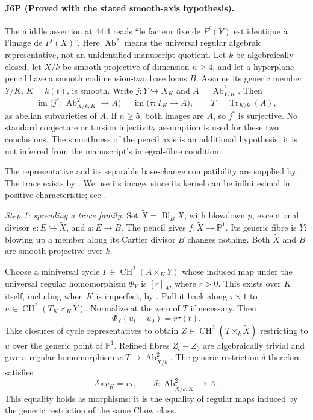 \paragraph{J6P (Proved with the stated smooth-axis hypothesis).}
The middle assertion at 44:4 reads ``le facteur fixe de $P^i(Y)$
est identique à l'image de $P^i(X)$''. Here $\operatorname{Ab}^2$ means the universal regular algebraic
representative, not an unidentified manuscript quotient.
Let $k$ be algebraically closed, let $X/k$ be smooth projective of
dimension $n\geq4$, and let a hyperplane pencil have a smooth
codimension-two base locus $B$. Assume its generic member $Y/K$,
$K=k(t)$, is smooth. Write $j:Y\hookrightarrow X_K$ and
$A=\operatorname{Ab}^2_{Y/K}$. Then
\begin{equation}\label{eq:J6P-trace}
 \operatorname{im}\bigl(j^*:\operatorname{Ab}^2_{X/k,K}\longrightarrow A\bigr)
 =\operatorname{im}\bigl(\tau:T_K\longrightarrow A\bigr),
 \qquad T=\operatorname{Tr}_{K/k}(A),
\end{equation}
as abelian subvarieties of $A$. If $n\geq5$, both images are $A$,
so $j^*$ is surjective. No standard conjecture or torsion
injectivity assumption is used for these two conclusions.
The smoothness of the pencil axis is an additional hypothesis:
it is not inferred from the manuscript's integral-fibre condition.

The representative and its separable base-change compatibility
are supplied by \cite[Theorems 6.1 and 5.10, pp.~25--27]{DGJ_ACMVFunctor}.
The trace exists by \cite[Definition 6.1 and Theorem 6.2, p.~20]{DGJ_Conrad2006}.
We use its image, since its kernel can be infinitesimal in positive
characteristic; see \cite[Theorem 6.12, pp.~22--23]{DGJ_Conrad2006}.

\emph{Step 1: spreading a trace family.}
Set $\widetilde X=\operatorname{Bl}_B X$, with blowdown $p$,
exceptional divisor $e:E\hookrightarrow\widetilde X$, and
$q:E\to B$. The pencil gives $f:\widetilde X\to\mathbb P^1$.
Its generic fibre is $Y$: blowing up a member along its Cartier
divisor $B$ changes nothing. Both $\widetilde X$ and $B$ are
smooth projective over $k$.

Choose a miniversal cycle
$\Gamma\in\operatorname{CH}^2(A\times_KY)$ whose induced map
under the universal regular homomorphism $\Phi_Y$ is $[r]_A$,
where $r>0$. This exists over $K$ itself, including when $K$ is
imperfect, by \cite[Lemma 4.7, pp.~18--19]{DGJ_ACMVFunctor}.
Pull it back along $\tau\times1$ to
$u\in\operatorname{CH}^2(T_K\times_KY)$. Normalize at the zero
of $T$ if necessary. Then
\[
 \Phi_Y(u_t-u_0)=r\tau(t).
\]
Take closures of cycle representatives to obtain
$Z\in\operatorname{CH}^2(T\times_k\widetilde X)$ restricting
to $u$ over the generic point of $\mathbb P^1$. Refined fibres
$Z_t-Z_0$ are algebraically trivial and give a regular
homomorphism $v:T\to\operatorname{Ab}^2_{\widetilde X/k}$.
The generic restriction $\delta$ therefore satisfies
\begin{equation}\label{eq:J6P-spread}
 \delta\circ v_K=r\tau,
 \qquad
 \delta:\operatorname{Ab}^2_{\widetilde X/k,K}\longrightarrow A.
\end{equation}
This equality holds as morphisms: it is the equality of regular
maps induced by the generic restriction of the same Chow class.

